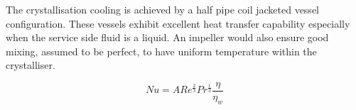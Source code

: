 The crystallisation cooling is achieved by a half pipe coil jacketed vessel configuration. These vessels exhibit excellent heat transfer capability especially when the service side fluid is a liquid. An impeller would also ensure good mixing, assumed to be perfect, to have uniform temperature within the crystalliser.

\begin{equation}

    Nu = ARe^{\frac{2}{3}}Pr^{\frac{1}{3}}\frac{\eta}{\eta_w}
    
\end{equation}


